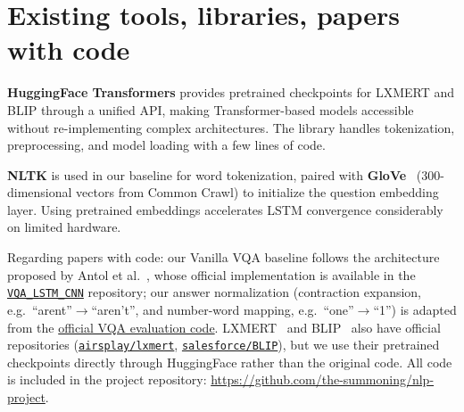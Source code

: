 \section{Existing tools, libraries, papers with code}

\textbf{HuggingFace Transformers} provides pretrained checkpoints for LXMERT and BLIP through a unified API, making Transformer-based models accessible without re-implementing complex architectures. The library handles tokenization, preprocessing, and model loading with a few lines of code.

\textbf{NLTK} is used in our baseline for word tokenization, paired with \textbf{GloVe}~\cite{pennington2014glove} (300-dimensional vectors from Common Crawl) to initialize the question embedding layer. Using pretrained embeddings accelerates LSTM convergence considerably on limited hardware.

Regarding papers with code: our Vanilla VQA baseline follows the architecture proposed by Antol et al.~\cite{antol2015vqa}, whose official implementation is available in the \href{https://github.com/GT-Vision-Lab/VQA_LSTM_CNN}{\texttt{VQA\_LSTM\_CNN}} repository; our answer normalization (contraction expansion, e.g.\ ``arent''$\to$``aren't'', and number-word mapping, e.g.\ ``one''$\to$``1'') is adapted from the \href{https://github.com/GT-Vision-Lab/VQA}{official VQA evaluation code}. LXMERT~\cite{tan2019lxmert} and BLIP~\cite{li2022blip} also have official repositories (\href{https://github.com/airsplay/lxmert}{\texttt{airsplay/lxmert}}, \href{https://github.com/salesforce/BLIP}{\texttt{salesforce/BLIP}}), but we use their pretrained checkpoints directly through HuggingFace rather than the original code. All code is included in the project repository: \url{https://github.com/the-summoning/nlp-project}.
